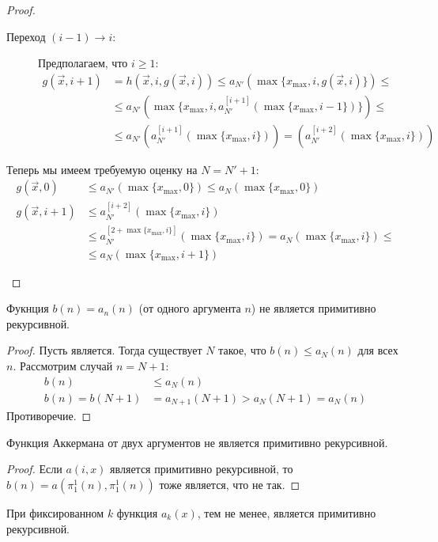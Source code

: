 \begin{proof}
\begin{enumerate}
\begin{description}
			\item[Переход $(i-1) \to i$:]
				Предполагаем, что $i \ge 1$:
				\begin{align*}
					g(\vec x, i + 1)
					&= h(\vec x, i, g(\vec x, i))
					 \le a_{N'}(\max \{ x_{\max}, i, g(\vec x, i) \}) \le \\
					&\le a_{N'}(\max \{ x_{\max}, i, a_{N'}^{[i+1]}(\max\{ x_{\max}, i - 1 \}) \}) \le \\
					&\le a_{N'}(a_{N'}^{[i+1]}(\max\{ x_{\max}, i \}))
					   = (a_{N'}^{[i+2]}(\max\{ x_{\max}, i \}))
				\end{align*}
		\end{description}

		Теперь мы имеем требуемую оценку на $N=N'+1$:
		\begin{align*}
			g(\vec x, 0) &\le a_{N'}(\max \{ x_{\max}, 0 \}) \le a_N(\max \{ x_{\max}, 0 \}) \\
			g(\vec x, i + 1)
			&\le a_{N'}^{[i+2]}(\max \{ x_{\max}, i \}) \\
			&\le a_{N'}^{[2 + \max \{ x_{\max}, i \}]}(\max \{ x_{\max}, i \})
			   = a_N(\max \{ x_{\max}, i \}) \le \\
			&\le a_N(\max \{ x_{\max}, i + 1 \})
		\end{align*}
	\end{enumerate}
\end{proof}

\begin{conseq}
	Фукнция $b(n)=a_n(n)$ (от одного аргумента $n$) не является примитивно рекурсивной.
\end{conseq}
\begin{proof}
	Пусть является.
	Тогда существует $N$ такое, что $b(n) \le a_N(n)$ для всех $n$.
	Рассмотрим случай $n=N+1$:
	\begin{align*}
		b(n) &\le a_N(n) \\
		b(n) = b(N+1) &= a_{N+1}(N+1) > a_N(N+1) = a_N(n)
	\end{align*}
	Противоречие.
\end{proof}

\begin{conseq}
	Функция Аккермана от двух аргументов не является примитивно рекурсивной.
\end{conseq}
\begin{proof}
	Если $a(i, x)$ является примитивно рекурсивной, то $b(n)=a(\pi_1^1(n), \pi_1^1(n))$ тоже является, что не так.
\end{proof}

\begin{Exercise}
	При фиксированном $k$ функция $a_k(x)$, тем не менее, является примитивно рекурсивной.
\end{Exercise}


